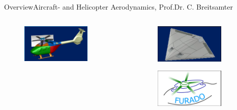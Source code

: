 \documentclass[AERbeamer%
              ,optEnglish%
              ,optBiber%
              ,optBibstyleAlphabetic%
              ,optBeamerClassicFormat%
              ]{AERlatex}%
\begin{document}
\begin{frame}[c]{Overview}{Aircraft- and Helicopter Aerodynamics, Prof.Dr. C. Breitsamter}
\begin{columns}[T]
\begin{column}{0.33\textwidth}
            \begin{figure}
                \centering
                \includegraphics[width=0.77\textwidth]{Breitsamter6.png}
            \end{figure}
        \end{column}
        \begin{column}{0.33\textwidth}
            \begin{figure}
                \centering
                \includegraphics[width=0.77\textwidth]{Breitsamter7.png}
            \end{figure}
            \begin{figure}
                \centering
                \includegraphics[width=0.77\textwidth]{Breitsamter8.png}
            \end{figure}
            \begin{figure}

\end{figure}
\end{column}
\end{columns}
\end{frame}
\end{document}

